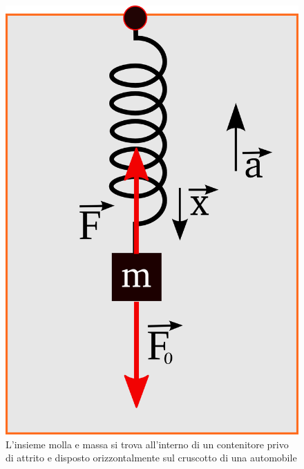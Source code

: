 \documentclass[a4paper,10pt,oneside]{article}
\begin{document}
\begin{figure}[H]
 \centering
 \includegraphics[height=0.4\textheight]{../immagini/accelerometro.png}
\caption{L'insieme molla e massa si trova all'interno di un contenitore privo di attrito e disposto orizzontalmente sul cruscotto di una automobile}
 \label{fig:accelerometro}
\end{figure}
\end{document}
